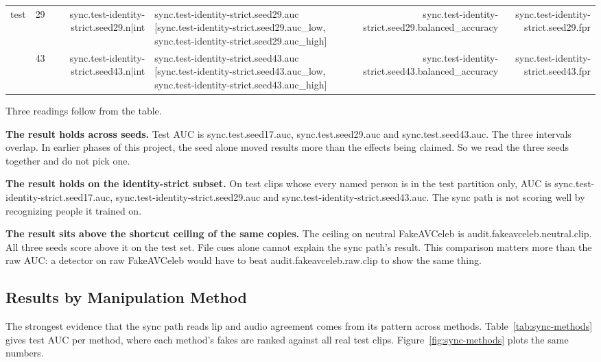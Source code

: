 \begin{table}[ht]
\begin{tabular}{l l r l r r}
        test            & 29 & {{sync.test-identity-strict.seed29.n|int}} & {{sync.test-identity-strict.seed29.auc}} [{{sync.test-identity-strict.seed29.auc_low}}, {{sync.test-identity-strict.seed29.auc_high}}] & {{sync.test-identity-strict.seed29.balanced_accuracy}} & {{sync.test-identity-strict.seed29.fpr}} \\
                        & 43 & {{sync.test-identity-strict.seed43.n|int}} & {{sync.test-identity-strict.seed43.auc}} [{{sync.test-identity-strict.seed43.auc_low}}, {{sync.test-identity-strict.seed43.auc_high}}] & {{sync.test-identity-strict.seed43.balanced_accuracy}} & {{sync.test-identity-strict.seed43.fpr}} \\
        \bottomrule
    \end{tabular}
\end{table}

Three readings follow from the table.

\textbf{The result holds across seeds.} Test AUC is
{{sync.test.seed17.auc}}, {{sync.test.seed29.auc}} and
{{sync.test.seed43.auc}}. The three intervals overlap. In earlier phases of
this project, the seed alone moved results more than the effects being
claimed. So we read the three seeds together and do not pick one.

\textbf{The result holds on the identity-strict subset.} On test clips whose
every named person is in the test partition only, AUC is
{{sync.test-identity-strict.seed17.auc}},
{{sync.test-identity-strict.seed29.auc}} and
{{sync.test-identity-strict.seed43.auc}}. The sync path is not scoring well by
recognizing people it trained on.

\textbf{The result sits above the shortcut ceiling of the same copies.} The
ceiling on neutral FakeAVCeleb is {{audit.fakeavceleb.neutral.clip}}. All
three seeds score above it on the test set. File cues alone cannot explain
the sync path's result. This comparison matters more than the raw AUC: a
detector on raw FakeAVCeleb would have to beat {{audit.fakeavceleb.raw.clip}}
to show the same thing.

\subsection{Results by Manipulation Method}

The strongest evidence that the sync path reads lip and audio agreement comes
from its pattern across methods. Table~\ref{tab:sync-methods} gives test AUC
per method, where each method's fakes are ranked against all real test clips.
Figure~\ref{fig:sync-methods} plots the same numbers.

